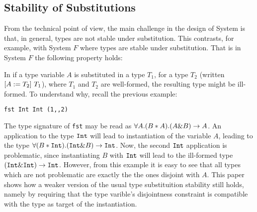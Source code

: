 

\subsection{Stability of Substitutions}
From the technical point of view, the main challenge in the design of
System \name is that, in general, types are not stable under
substitution. This contrasts, for example, with System $F$ where types
are stable under substitution. That is in System $F$ the following
property holds: 

In \name if a type variable $A$ is substituted in a type $T_1$, for a type $T_2$ 
(written $\subst {T_2} A {T_1}$), where $T_1$ and $T_2$ are well-formed, the resulting type might be ill-formed. 
To understand why, recall the previous example: 
\begin{lstlisting}
fst Int Int (1,,2)
\end{lstlisting}
The type signature of \lstinline$fst$ may be read as $\forall A. (B * A) . (A \inter B) \to A$.
An application to the type $\tyint$ will lead to instantiation of the variable $A$, leading to the type
$\forall (B * \tyint). (\tyint \inter B) \to \tyint$.
Now, the second $\tyint$ application is problematic, since instantiating $B$ with $\tyint$ will lead to
the ill-formed type $(\tyint \inter \tyint) \to \tyint$.
However, from this example it is easy to see that all types which are not problematic are exactly the
the ones disjoint with $A$.
This paper shows how a weaker version of the usual type substituition stability still holds, 
namely by requiring that the type varible's disjointness constraint is compatible
with the type as target of the instantiation. 

